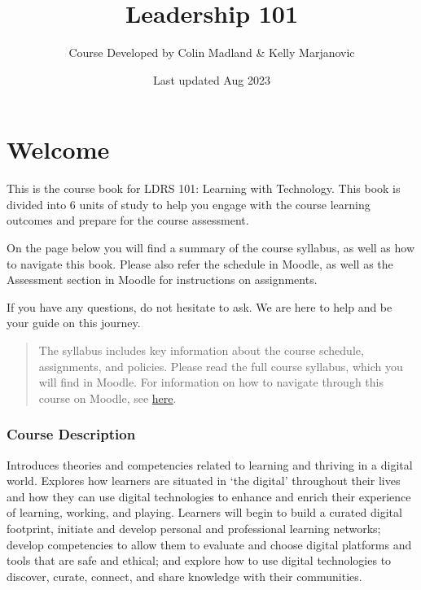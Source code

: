 \documentclass[
]{book}
\title{Leadership 101}
\author{Course Developed by Colin Madland \& Kelly Marjanovic}
\date{Last updated Aug 2023}
\theoremstyle{definition}
\theoremstyle{definition}
\theoremstyle{definition}
\theoremstyle{definition}
\theoremstyle{remark}
\begin{document}
\maketitle

{
\setcounter{tocdepth}{1}
\tableofcontents
}
\hypertarget{welcome}{%
\chapter*{Welcome}\label{welcome}}

This is the course book for LDRS 101: Learning with Technology. This book is divided into 6 units of study to help you engage with the course learning outcomes and prepare for the course assessment.

On the page below you will find a summary of the course syllabus, as well as how to navigate this book. Please also refer the schedule in Moodle, as well as the Assessment section in Moodle for instructions on assignments.

If you have any questions, do not hesitate to ask. We are here to help and be your guide on this journey.

\begin{quote}
The syllabus includes key information about the course schedule, assignments, and policies. Please read the full course syllabus, which you will find in Moodle. For information on how to navigate through this course on Moodle, see \href{https://trinitywestern.teamdynamix.com/TDClient/1904/Portal/KB/?CategoryID=8214}{here}.
\end{quote}

\hypertarget{course-description}{%
\subsection*{Course Description}\label{course-description}}

Introduces theories and competencies related to learning and thriving in a digital world. Explores how learners are situated in `the digital' throughout their lives and how they can use digital technologies to enhance and enrich their experience of learning, working, and playing. Learners will begin to build a curated digital footprint, initiate and develop personal and professional learning networks; develop competencies to allow them to evaluate and choose digital platforms and tools that are safe and ethical; and explore how to use digital technologies to discover, curate, connect, and share knowledge with their communities.
\end{document}
